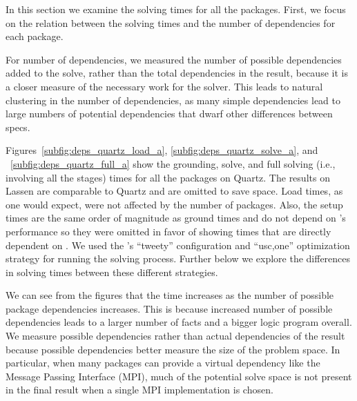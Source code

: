 In this section we examine the solving times for all the packages. First, we focus on
the relation between the solving times and the number of dependencies for each package.

For number of dependencies, we measured the number of possible
dependencies added to the solve, rather than the total dependencies in
the result, because it is a closer measure of the necessary work for
the solver. This leads to natural clustering in the number of
dependencies, as many simple dependencies lead to large numbers of
potential dependencies that dwarf other differences between specs.

Figures~\ref{subfig:deps_quartz_load_a}, \ref{subfig:deps_quartz_solve_a}, and
~\ref{subfig:deps_quartz_full_a} show the grounding, solve, and full solving (i.e.,
involving all the stages) times for all the packages on Quartz. The results on Lassen
are comparable to Quartz and are omitted to save space. Load times, as one would expect,
were not affected by the number of packages. Also, the setup times are the same order of
magnitude as ground times and do not depend on \clingo{}'s performance so they were
omitted in favor of showing times that are directly dependent on \clingo{}. We used the
\clingo{}'s ``tweety'' configuration and ``usc,one'' optimization strategy for running
the solving process. Further below we explore the differences in solving times between
these different strategies.

We can see from the figures that the time increases as the number of possible package
dependencies increases. This is because increased number of possible dependencies leads
to a larger number of facts and a bigger logic program overall. We measure possible
dependencies rather than actual dependencies of the result because possible dependencies
better measure the size of the problem space. In particular, when many packages can
provide a virtual dependency like the Message Passing Interface (MPI), much of the
potential solve space is not present in the final result when a single MPI
implementation is chosen.

